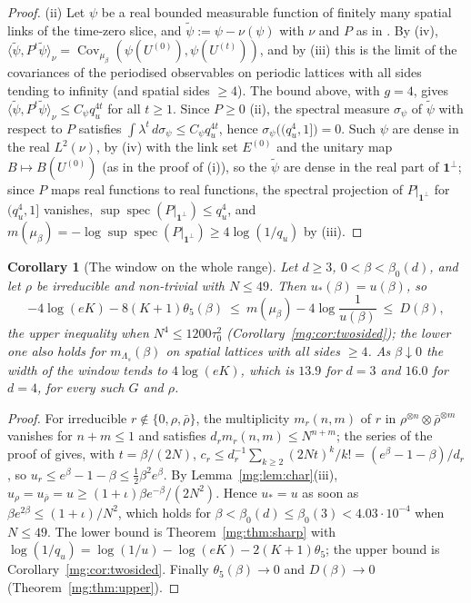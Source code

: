 \documentclass[11pt,a4paper]{article}
\newtheorem{corollary}[theorem]{Corollary}
\theoremstyle{definition}
\theoremstyle{remark}
\DeclareMathOperator{\Cov}{Cov}
\DeclareMathOperator{\spec}{spec}
\newcommand{\ip}[2]{\langle #1,#2\rangle}
\newcommand{\Flab}[2]{\cite[#1 \texttt{#2}]{F}}
\newcommand{\IIref}[3]{\cite[#1~`#2' (\texttt{#3})]{II}}
\newcommand{\IIlab}[2]{\cite[#1 \texttt{#2}]{II}}
\begin{document}
\begin{proof}
(ii) Let $\psi$ be a real bounded measurable function of finitely many spatial links of the time-zero slice, and $\tilde\psi:=\psi-\nu(\psi)$ with $\nu$
and $P$ as in \IIref{Corollary}{The time-slice chain}{iv:cor:chain}. By \IIlab{Corollary}{iv:cor:chain}(iv),
$\ip{\tilde\psi}{P^t\tilde\psi}_\nu=\Cov_{\mu_\beta}(\psi(U^{(0)}),\psi(U^{(t)}))$, and by \IIref{Theorem}{Uniqueness and convergence}{iv:thm:unique}(iii)
this is the limit of the covariances of the periodised observables on periodic lattices with all sides tending to infinity (and spatial
sides $\ge4$). The bound above, with $g=4$, gives $\ip{\tilde\psi}{P^t\tilde\psi}_\nu\le C_\psi q_u^{4t}$ for all $t\ge1$. Since $P\ge0$
\IIref{Theorem}{Transfer operator, ground-state chain and mass gap}{iv:thm:gap}(ii), the spectral measure $\sigma_\psi$ of $\tilde\psi$ with
respect to $P$ satisfies $\int\lambda^t\,d\sigma_\psi\le C_\psi q_u^{4t}$, hence $\sigma_\psi\bigl((q_u^4,1]\bigr)=0$. Such $\psi$ are dense in the real
$L^2(\nu)$, by \IIlab{Lemma}{iv:lem:measures}(iv) with the link set $E^{(0)}$ and the unitary map $B\mapsto B(U^{(0)})$ (as in the proof of
\IIlab{Theorem}{iv:thm:gap}(i)), so the $\tilde\psi$ are dense in the real part of $\mathbf1^\perp$; since $P$ maps real functions to real functions,
the spectral projection of $P|_{\mathbf1^\perp}$ for $(q_u^4,1]$ vanishes, $\sup\spec(P|_{\mathbf1^\perp})\le q_u^4$, and
$m(\mu_\beta)=-\log\sup\spec(P|_{\mathbf1^\perp})\ge4\log(1/q_u)$ by \IIlab{Theorem}{iv:thm:gap}(iii).
\end{proof}

\begin{corollary}[The window on the whole range]\label{mg:cor:window}
Let $d\ge3$, $0<\beta<\beta_0(d)$, and let $\rho$ be irreducible and non-trivial with $N\le49$. Then $u_*(\beta)=u(\beta)$, so
\[
-4\log(eK)-8(K+1)\theta_5(\beta)\ \le\ m(\mu_\beta)-4\log\frac1{u(\beta)}\ \le\ D(\beta),
\]
the upper inequality when $N^4\le1200\tau_0^2$ (Corollary~\ref{mg:cor:twosided}); the lower one also holds for $m_{\Lambda_s}(\beta)$ on
spatial lattices with all sides $\ge4$. As $\beta\downarrow0$ the width of the window tends to $4\log(eK)$, which is $13.9$ for $d=3$ and
$16.0$ for $d=4$, for every such $G$ and $\rho$.
\end{corollary}

\begin{proof}
For irreducible $r\notin\{0,\rho,\bar\rho\}$, the multiplicity $m_r(n,m)$ of $r$ in $\rho^{\otimes n}\otimes\bar\rho^{\otimes m}$ vanishes for
$n+m\le1$ and satisfies $d_rm_r(n,m)\le N^{n+m}$; the series of the proof of \Flab{Lemma}{lem:cr} gives, with $t=\beta/(2N)$,
$c_r\le d_r^{-1}\sum_{k\ge2}(2Nt)^k/k!=(e^\beta-1-\beta)/d_r$, so $u_r\le e^\beta-1-\beta\le\frac12\beta^2e^\beta$. By
Lemma~\ref{mg:lem:char}(iii), $u_\rho=u_{\bar\rho}=u\ge(1+\iota)\beta e^{-\beta}/(2N^2)$. Hence $u_*=u$ as soon as $\beta e^{2\beta}\le(1+\iota)/N^2$, which
holds for $\beta<\beta_0(d)\le\beta_0(3)<4.03\cdot10^{-4}$ when $N\le49$. The lower bound is Theorem~\ref{mg:thm:sharp} with
$\log(1/q_u)=\log(1/u)-\log(eK)-2(K+1)\theta_5$; the upper bound is Corollary~\ref{mg:cor:twosided}. Finally $\theta_5(\beta)\to0$ and
$D(\beta)\to0$ (Theorem~\ref{mg:thm:upper}).
\end{proof}
\end{document}
